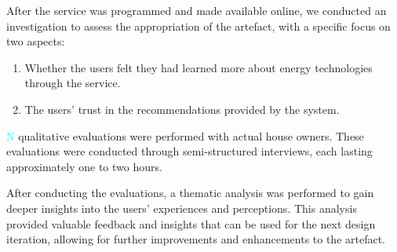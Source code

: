 After the service was programmed and made available online, 
we conducted an investigation to assess the appropriation of the artefact,
with a specific focus on two aspects:
\begin{enumerate}
    \item Whether the users felt they had learned more about energy technologies through the service.
    \item The users' trust in the recommendations provided by the system. 
\end{enumerate}
\textcolor{cyan}{N} qualitative evaluations were performed with actual house owners. 
These evaluations were conducted through semi-structured interviews, 
each lasting approximately one to two hours. 

After conducting the evaluations, a thematic analysis was performed to gain deeper insights into the users' experiences and perceptions. 
This analysis provided valuable feedback and insights that can be used for the next design iteration, allowing for further improvements and enhancements to the artefact. 

